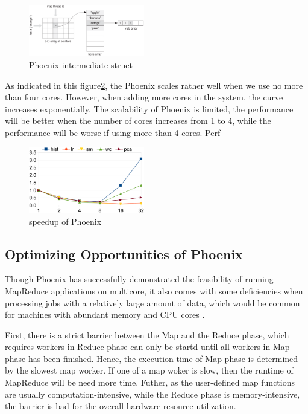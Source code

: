 \begin{figure}[!h!t]  
    \centering
    \includegraphics[width=0.45\textwidth]{eps/phoenix_intermediate.eps}
    \caption{Phoenix intermediate struct}
    \label{fig:phoenix:intermediate}
\end{figure}

As indicated in this figure\ref{fig:phoenix:speedup}, 
the Phoenix scales rather well when we use no more than four cores. 
However, when adding more cores in the system, 
the curve increases exponentially. 
The scalability of Phoenix is limited, the performance will be
better when the number of cores increases from 1 to 4, 
while the performance will be worse if using more than 4 cores. 
Perf\cite{} 


\begin{figure}[!h!t]  
    \centering
    \includegraphics[width=0.45\textwidth]{eps/phoenix_speedup.eps}
    \caption{speedup of Phoenix}
    \label{fig:phoenix:speedup}
\end{figure}


\subsection{Optimizing Opportunities of Phoenix}
Though Phoenix has successfully demonstrated the feasibility
of running MapReduce applications on multicore, 
it also comes with some deficiencies 
{\color{gray}when processing jobs with a relatively large
amount of data, which would be common for machines with abundant memory and CPU cores
}.

First, there is a strict barrier between the Map and the Reduce phase, 
which requires workers in Reduce phase can only 
be startd until all workers in Map phase has been finished. 
Hence, the execution time of Map phase is determined by the slowest map worker.
If one of a map woker is slow, then the runtime of MapReduce will be need more time.
Futher, as the user-defined map functions are usually computation-intensive,
while the Reduce phase is memory-intensive,
the barrier is bad for the overall hardware resource utilization.


